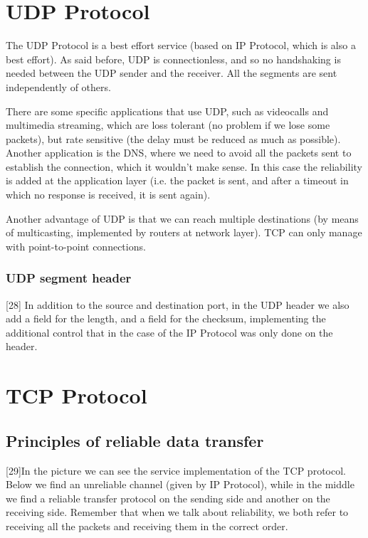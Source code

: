 \section{UDP Protocol}
The UDP Protocol is a best effort service (based on IP Protocol, which is also a best effort). As said before, UDP is connectionless, and so no handshaking is needed between the UDP sender and the receiver. All the segments are sent independently of others.

There are some specific applications that use UDP, such as videocalls and multimedia streaming, which are loss tolerant (no problem if we lose some packets), but rate sensitive (the delay must be reduced as much as possible). Another application is the DNS, where we need to avoid all the packets sent to establish the connection, which it wouldn't make sense. In this case the reliability is added at the application layer (i.e. the packet is sent, and after a timeout in which no response is received, it is sent again).

Another advantage of UDP is that we can reach multiple destinations (by means of multicasting, implemented by routers at network layer). TCP can only manage with point-to-point connections.

\subsubsection{UDP segment header}
[28] In addition to the source and destination port, in the UDP header we also add a field for the length, and a field for the checksum, implementing the additional control that in the case of the IP Protocol was only done on the header.

\section{TCP Protocol}
\subsection{Principles of reliable data transfer}
[29]In the picture we can see the service implementation of the TCP protocol. Below we find an unreliable channel (given by IP Protocol), while in the middle we find a reliable transfer protocol on the sending side and another on the receiving side. Remember that when we talk about reliability, we both refer to receiving all the packets and receiving them in the correct order.

